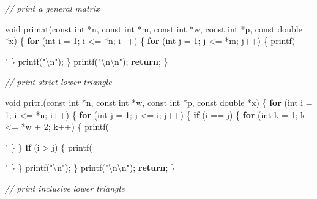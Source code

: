 \documentclass[12pt,]{article}
\newenvironment{Shaded}{\begin{snugshade}}{\end{snugshade}}
\newcommand{\DataTypeTok}[1]{\textcolor[rgb]{0.13,0.29,0.53}{#1}}
\newcommand{\DecValTok}[1]{\textcolor[rgb]{0.00,0.00,0.81}{#1}}
\newcommand{\CharTok}[1]{\textcolor[rgb]{0.31,0.60,0.02}{#1}}
\newcommand{\SpecialCharTok}[1]{\textcolor[rgb]{0.00,0.00,0.00}{#1}}
\newcommand{\StringTok}[1]{\textcolor[rgb]{0.31,0.60,0.02}{#1}}
\newcommand{\CommentTok}[1]{\textcolor[rgb]{0.56,0.35,0.01}{\textit{#1}}}
\newcommand{\ControlFlowTok}[1]{\textcolor[rgb]{0.13,0.29,0.53}{\textbf{#1}}}
\newcommand{\NormalTok}[1]{#1}
\begin{document}
\begin{Shaded}
\begin{Highlighting}[]
\CommentTok{// print a general matrix}

\DataTypeTok{void}\NormalTok{ primat(}\DataTypeTok{const} \DataTypeTok{int}\NormalTok{ *n, }\DataTypeTok{const} \DataTypeTok{int}\NormalTok{ *m, }\DataTypeTok{const} \DataTypeTok{int}\NormalTok{ *w, }\DataTypeTok{const} \DataTypeTok{int}\NormalTok{ *p,}
            \DataTypeTok{const} \DataTypeTok{double}\NormalTok{ *x) \{}
    \ControlFlowTok{for}\NormalTok{ (}\DataTypeTok{int}\NormalTok{ i = }\DecValTok{1}\NormalTok{; i <= *n; i++) \{}
        \ControlFlowTok{for}\NormalTok{ (}\DataTypeTok{int}\NormalTok{ j = }\DecValTok{1}\NormalTok{; j <= *m; j++) \{}
\NormalTok{            printf(}\StringTok{" %
\NormalTok{        \}}
\NormalTok{        printf(}\StringTok{"}\SpecialCharTok{\textbackslash{}n}\StringTok{"}\NormalTok{);}
\NormalTok{    \}}
\NormalTok{    printf(}\StringTok{"}\SpecialCharTok{\textbackslash{}n\textbackslash{}n}\StringTok{"}\NormalTok{);}
    \ControlFlowTok{return}\NormalTok{;}
\NormalTok{\}}

\CommentTok{// print strict lower triangle}

\DataTypeTok{void}\NormalTok{ pritrl(}\DataTypeTok{const} \DataTypeTok{int}\NormalTok{ *n, }\DataTypeTok{const} \DataTypeTok{int}\NormalTok{ *w, }\DataTypeTok{const} \DataTypeTok{int}\NormalTok{ *p, }\DataTypeTok{const} \DataTypeTok{double}\NormalTok{ *x) \{}
    \ControlFlowTok{for}\NormalTok{ (}\DataTypeTok{int}\NormalTok{ i = }\DecValTok{1}\NormalTok{; i <= *n; i++) \{}
        \ControlFlowTok{for}\NormalTok{ (}\DataTypeTok{int}\NormalTok{ j = }\DecValTok{1}\NormalTok{; j <= i; j++) \{}
            \ControlFlowTok{if}\NormalTok{ (i == j) \{}
                \ControlFlowTok{for}\NormalTok{ (}\DataTypeTok{int}\NormalTok{ k = }\DecValTok{1}\NormalTok{; k <= *w + }\DecValTok{2}\NormalTok{; k++) \{}
\NormalTok{                    printf(}\StringTok{"%
\NormalTok{                \}}
\NormalTok{            \}}
            \ControlFlowTok{if}\NormalTok{ (i > j) \{}
\NormalTok{                printf(}\StringTok{" %
\NormalTok{            \}}
\NormalTok{        \}}
\NormalTok{        printf(}\StringTok{"}\SpecialCharTok{\textbackslash{}n}\StringTok{"}\NormalTok{);}
\NormalTok{    \}}
\NormalTok{    printf(}\StringTok{"}\SpecialCharTok{\textbackslash{}n\textbackslash{}n}\StringTok{"}\NormalTok{);}
    \ControlFlowTok{return}\NormalTok{;}
\NormalTok{\}}

\CommentTok{// print inclusive lower triangle}

}}}
\end{Highlighting}
\end{Shaded}
\end{document}
